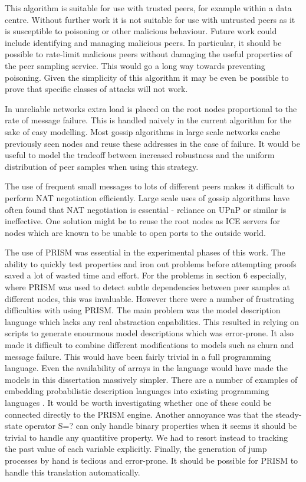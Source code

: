 \documentclass[a4paper,10pt]{article}
\begin{document}
This algorithm is suitable for use with trusted peers, for example within a data centre. Without further work it is not suitable for use with untrusted peers as it is susceptible to poisoning or other malicious behaviour. Future work could include identifying and managing malicious peers. In particular, it should be possible to rate-limit malicious peers without damaging the useful properties of the peer sampling service. This would go a long way towards preventing poisoning. Given the simplicity of this algorithm it may be even be possible to prove that specific classes of attacks will not work.

In unreliable networks extra load is placed on the root nodes proportional to the rate of message failure. This is handled naively in the current algorithm for the sake of easy modelling. Most gossip algorithms in large scale networks cache previously seen nodes and reuse these addresses in the case of failure. It would be useful to model the tradeoff between increased robustness and the uniform distribution of peer samples when using this strategy.

The use of frequent small messages to lots of different peers makes it difficult to perform NAT negotiation efficiently. Large scale uses of gossip algorithms have often found that NAT negotiation is essential \cite{arrg, tribler} - reliance on UPnP or similar is ineffective. One solution might be to reuse the root nodes as ICE servers for nodes which are known to be unable to open ports to the outside world.

The use of PRISM was essential in the experimental phases of this work. The ability to quickly test properties and iron out problems before attempting proofs saved a lot of wasted time and effort. For the problems in section 6 especially, where PRISM was used to detect subtle dependencies between peer samples at different nodes, this was invaluable. However there were a number of frustrating difficulties with using PRISM. The main problem was the model description language which lacks any real abstraction capabilities. This resulted in relying on scripts to generate enourmous model descriptions which was error-prone. It also made it difficult to combine different modifications to models such as churn and message failure. This would have been fairly trivial in a full programming language. Even the availability of arrays in the language would have made the models in this dissertation massively simpler. There are a number of examples of embedding probabilistic description languages into existing programming languages \cite{pfp, ocaml_cont}. It would be worth investigating whether one of these could be connected directly to the PRISM engine. Another annoyance was that the steady-state operator S=? can only handle binary properties when it seems it should be trivial to handle any quantitive property. We had to resort instead to tracking the past value of each variable explicitly. Finally, the generation of jump processes by hand is tedious and error-prone. It should be possible for PRISM to handle this translation automatically.
\end{document}
